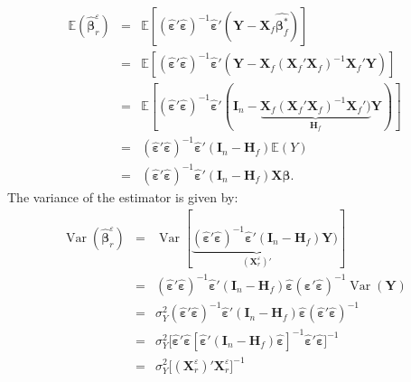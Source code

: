 \documentclass[12pt,a4paper]{report}
\begin{document}
\begin{eqnarray}
	\mathbb{E}(\hat{\boldsymbol{\beta}}_r^{\varepsilon})&=&\mathbb{E}[(\hat{\boldsymbol{\varepsilon}}'\hat{\boldsymbol{\varepsilon}})^{-1}\hat{\boldsymbol{\varepsilon}}'(\boldsymbol{Y}- \boldsymbol{X}_f\hat{\boldsymbol{\beta}^*_f})] \nonumber \\
	&=&\mathbb{E}[(\hat{\boldsymbol{\varepsilon}}'\hat{\boldsymbol{\varepsilon}})^{-1}\hat{\boldsymbol{\varepsilon}}'(\boldsymbol{Y}- \boldsymbol{X}_f(\boldsymbol{X}_f'\boldsymbol{X}_f)^{-1}\boldsymbol{X}_f'\boldsymbol{Y})]  \nonumber \\
	&=&\mathbb{E}[(\hat{\boldsymbol{\varepsilon}}'\hat{\boldsymbol{\varepsilon}})^{-1}\hat{\boldsymbol{\varepsilon}}'(\boldsymbol{I}_n- \underbrace{\boldsymbol{X}_f(\boldsymbol{X}_f'\boldsymbol{X}_f)^{-1}\boldsymbol{X}_f')}_{\boldsymbol{H}_f}\boldsymbol{Y})] \nonumber  \\
	&=&(\hat{\boldsymbol{\varepsilon}}'\hat{\boldsymbol{\varepsilon}})^{-1}\hat{\boldsymbol{\varepsilon}}'(\boldsymbol{I}_n- \boldsymbol{H}_f) \mathbb{E} (Y)\nonumber \\
	&=&(\hat{\boldsymbol{\varepsilon}}'\hat{\boldsymbol{\varepsilon}})^{-1}\hat{\boldsymbol{\varepsilon}}'(\boldsymbol{I}_n- \boldsymbol{H}_f) \boldsymbol{X}\boldsymbol{\beta}.\nonumber
\end{eqnarray}
The variance of the estimator is given by:
\begin{eqnarray}
	\operatorname{Var}(\hat{\boldsymbol{\beta}}_r^{\varepsilon})&=& \operatorname{Var}[\underbrace{(\hat{\boldsymbol{\varepsilon}}'\hat{\boldsymbol{\varepsilon}})^{-1}\hat{\boldsymbol{\varepsilon}}'(\boldsymbol{I}_n- \boldsymbol{H}_f)}_{(\boldsymbol{X}_r^{\varepsilon})'}\boldsymbol{Y})] \nonumber  \\
	&=&(\hat{\boldsymbol{\varepsilon}}'\hat{\boldsymbol{\varepsilon}})^{-1}\hat{\boldsymbol{\varepsilon}}'(\boldsymbol{I}_n-\boldsymbol{H}_f)\hat{\boldsymbol{\varepsilon}}(\hat{\boldsymbol{\varepsilon}}'\hat{\boldsymbol{\varepsilon}})^{-1}\operatorname{Var}(\boldsymbol{Y})\nonumber\\
	&=&\sigma^2_Y(\hat{\boldsymbol{\varepsilon}}'\hat{\boldsymbol{\varepsilon}})^{-1}\hat{\boldsymbol{\varepsilon}}'(\boldsymbol{I}_n-\boldsymbol{H}_f)\hat{\boldsymbol{\varepsilon}}(\hat{\boldsymbol{\varepsilon}}'\hat{\boldsymbol{\varepsilon}})^{-1} \label{varpluginr} \\
	&=& \sigma^2_Y\big[\hat{\boldsymbol{\varepsilon}}'\hat{\boldsymbol{\varepsilon}}[\hat{\boldsymbol{\varepsilon}}'(\boldsymbol{I}_n-\boldsymbol{H}_f)\hat{\boldsymbol{\varepsilon}}]^{-1}\hat{\boldsymbol{\varepsilon}}'\hat{\boldsymbol{\varepsilon}}\big]^{-1} \nonumber \\
	&=&\sigma^2_Y\big[(\boldsymbol{X}_r^{\varepsilon})'\boldsymbol{X}_r^{\varepsilon}\big]^{-1}
\nonumber
\end{eqnarray}
\end{document}
